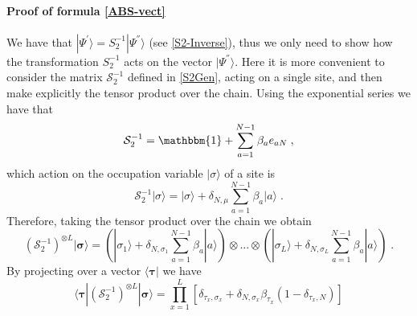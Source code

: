 \documentclass[10pt]{article}
\numberwithin{equation}{section}
\numberwithin{equation}{subsection}
\newcommand{\co}{\;,}
\newcommand{\dt}{\;.}
\newcommand{\com}[1]{{ (* {\color{red}\small #1}*)}}
\begin{document}
\paragraph{Proof of formula \eqref{ABS-vect}} We have that $|\Psi^{'}\rangle=S_{2}^{-1}|\Psi^{''}\rangle$ (see \eqref{S2-Inverse}), thus we only need to show how the transformation $S_{2}^{-1}$ acts on the vector $|\Psi^{''}\rangle$. Here it is more convenient to consider the matrix $\mathcal{S}_{2}^{-1}$ defined in \eqref{S2Gen}, acting on a single site, and then make explicitly the tensor product over the chain. Using the exponential series we have that  
\begin{equation}
   \mathcal{S}_{2}^{-1}=\mathbbm{1}+\sum_{a=1}^{N-1}\beta_{a}e_{aN}\co
\end{equation}
which action on the occupation variable $|\sigma\rangle$ of a site is 
\begin{equation}
  \mathcal{S}_{2}^{-1} |\sigma\rangle= |\sigma\rangle+\delta_{N,\mu}\sum_{a=1}^{N-1}\beta_a|a\rangle\dt
\end{equation} 
Therefore, taking the tensor product over the chain we obtain 
\begin{equation}
  \left(\mathcal{S}_{2}^{-1}\right)^{\otimes L} |\bm{\sigma}\rangle=\left( |\sigma_1\rangle+\delta_{N,\sigma_1}\sum_{a=1}^{N-1}\beta_a|a\rangle\right)\otimes\ldots\otimes \left( |\sigma_L\rangle+\delta_{N,\sigma_L}\sum_{a=1}^{N-1}\beta_a|a\rangle\right)\dt
\end{equation} 
By projecting over a vector $\langle \bm{\tau}|$ we have 
\begin{equation}\label{goodTP-S2}
  \langle \bm{\tau}|\left(\mathcal{S}_{2}^{-1}\right)^{\otimes L} |\bm{\sigma}\rangle=\prod_{x=1}^L\left[ \delta_{\tau_x,\sigma_x}+\delta_{N,\sigma_x}\beta_{\tau_x} (1-\delta_{\tau_x,N})\right]
\end{equation} 
\begin{comment}
{\color{blue}
We introduce $\forall x\in\{1,\ldots,L\}$, for $i\in \{1,\ldots,L\}$ and $q_{1},\ldots,q_{i}\in\{1,\ldots,L\}$ 
\begin{equation}
	\varphi_{x}^{i}(q_{1},\ldots,q_{i})=\begin{cases}
		\tau_{x}\qquad &\text{if}\quad x\notin\{q_{1},\ldots,q_{i}\}\\
		N\qquad &\text{if}\quad x\in\{q_{1},\ldots,q_{i}\}\\
	\end{cases}\dt
\end{equation}
This is a new configuration at site $x$ where, if $x\in\{q_{1},\ldots,q_{i}\}$, the occupation $\tau_{x}$ is replaced by $N$, while it is left uncaged if $x\notin \{q_{1},\ldots,q_{i}\}$. The dependence of $\varphi_{x}^{i}(q_{1},\ldots,q_{i})$ with respect to $q_{1},\ldots,q_{i}$ is usually understood for the sake of notation. } 
\end{comment}
\end{document}
